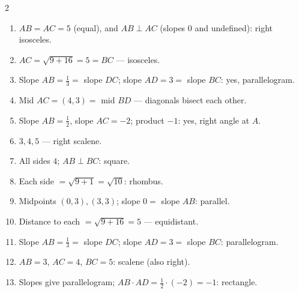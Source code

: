 \documentclass[11pt]{article}
\begin{document}
\begin{keybox}
\begin{multicols}{2}
\small
\begin{enumerate}[leftmargin=*,itemsep=3pt]
  \item $AB=AC=5$ (equal), and $AB\perp AC$ (slopes $0$ and undefined): right isosceles.
  \item $AC=\sqrt{9+16}=5=BC$ --- isosceles.
  \item Slope $AB=\tfrac13=$ slope $DC$; slope $AD=3=$ slope $BC$: yes, parallelogram.
  \item Mid $AC=(4,3)=$ mid $BD$ --- diagonals bisect each other.
  \item Slope $AB=\tfrac12$, slope $AC=-2$; product $-1$: yes, right angle at $A$.
  \item $3,4,5$ --- right scalene.
  \item All sides $4$; $AB\perp BC$: square.
  \item Each side $=\sqrt{9+1}=\sqrt{10}$: rhombus.
  \item Midpoints $(0,3),(3,3)$; slope $0=$ slope $AB$: parallel.
  \item Distance to each $=\sqrt{9+16}=5$ --- equidistant.
  \item Slope $AB=\tfrac13=$ slope $DC$; slope $AD=3=$ slope $BC$: parallelogram.
  \item $AB=3$, $AC=4$, $BC=5$: scalene (also right).
  \item Slopes give parallelogram; $AB\cdot AD=\tfrac12\cdot(-2)=-1$: rectangle.
\end{enumerate}
\end{multicols}
\end{keybox}
\end{document}
